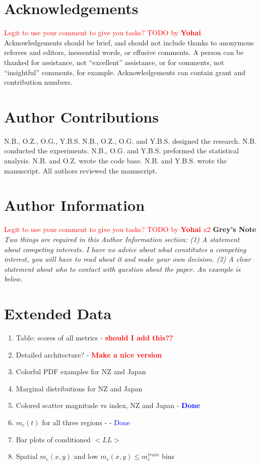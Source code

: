\documentclass[pdflatex]{sn-jnl}
\newcommand{\yohai}[1]{{\textcolor{red}{#1}}}
\begin{document}
\newpage
\section*{Acknowledgements}
\yohai{Legit to use your comment to give you tasks? TODO by \textbf{Yohai}}
Acknowledgements should be brief, and should not include thanks to anonymous referees and editors, inessential words, or effusive comments. A person can be thanked for assistance, not “excellent” assistance, or for comments, not “insightful” comments, for example. Acknowledgements can contain grant and contribution numbers.

\section*{Author Contributions}
N.B., O.Z., O.G., Y.B.S.
N.B., O.Z., O.G. and Y.B.S. designed the research. N.B. conducted the experiments. N.B., O.G. and Y.B.S. preformed the statistical analysis. N.B. and O.Z. wrote the code base. N.B. and Y.B.S. wrote the manuscript. All authors reviewed the manuscript.

\section*{Author Information}
\yohai{Legit to use your comment to give you tasks? TODO by \textbf{Yohai} x2}
\textbf{Grey's Note} \textit{Two things are required in this Author Information section: (1) A statement about competing interests. I have no advice about what constitutes a competing interest, you will have to read about it and make your own decision. (2) A clear statement about who to contact with question about the paper. An example is below.}


\newpage
\section*{Extended Data}
\begin{enumerate}
    \item Table: scores of all metrics - \textcolor{red}{\textbf{should I add this??}}
    \item Detailed architecture? - \textcolor{red}{\textbf{Make a nice version}}
    \item Colorful PDF examples for NZ and Japan
    \item Marginal distributions for NZ and Japan
    \item Colored scatter magnitude vs index, NZ and Japan - \textcolor{blue}{\textbf{Done}}
    \item $m_c(t)$ for all three regions -  - \textcolor{blue}{Done}
    \item Bar plots of conditioned $<LL>$
    \item Spatial $m_c(x, y)$ and low $m_c(x, y) \leq m_c^{train}$ bins
\end{enumerate}
\end{document}
